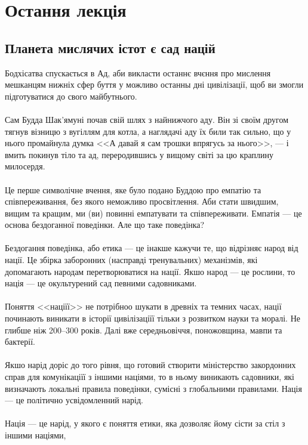 \section{Остання лекція}

\subsection{Планета мислячих істот є сад націй}

Бодхісатва спускається в Ад, аби викласти останнє вчєння про мислення
мешканцям нижніх сфер буття у можливо останны дні цивілізації, щоб ви
змогли підготуватися до свого майбутнього.
\\
\\
Сам Будда Шак'ямуні почав свій шлях з найнижчого аду. Він зі своїм другом
тягнув візницю з вугіллям для котла, а наглядачі аду їх били так сильно,
що у нього промайнула думка <<А давай я сам трошки впрягусь за нього>>, --- і вмить
покинув тіло та ад, переродившись у вищому світі за цю краплину милосердя.
\\
\\
Це перше символічне вчення, яке було подано Буддою про емпатію та співпереживання,
без якого неможливо просвітлення. Аби стати швидшим, вищим та кращим, ми (ви)
повинні емпатувати та співпереживати. Емпатія --- це основа бездоганної поведінки.
Але що таке поведінка?
\\
\\
Бездогання поведінка, або етика --- це інакше кажучи те, що відрізняє народ від нації.
Це збірка заборонних (насправді тренувальних) механізмів, які допомагають народам перетворюватися на нації.
Якшо народ --- це рослини, то нація --- це окультурений сад певними садовниками.
\\
\\
Поняття <<націїї>> не потрібноо шукати в древніх та темних часах, нації починають виникати
в історії цивілізаціїї тільки з розвитком науки та моралі. Не глибше ніж 200--300 років. Далі
вже середньовіччя, поножовщина, мавпи та бактерії.
\\
\\
Якшо нарід доріс до того рівня, що готовий створити міністерство закордонних справ для комунікаціїї
з іншими націями, то в ньому виникають садовники, які визначають локальні правила поведінки,
сумісні з глобальними правилами. Нація --- це політично усвідомленний нарід.
\\
\\
Нація --- це нарід, у якого є поняття етики, яка дозволяє йому сісти за стіл з іншими націями,
